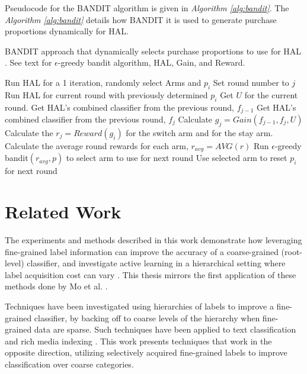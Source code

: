 \documentclass[ms]{nuthesis}
\begin{document}
Pseudocode for the BANDIT algorithm is given in \textit{Algorithm \ref{alg:bandit}}. The
\textit{Algorithm \ref{alg:bandit}} details how BANDIT it is used to generate
purchase proportions dynamically for HAL.

\begin{algorithm}[!htb]
\small{
\caption{ BANDIT approach that dynamically selects purchase
proportions to use for HAL \cite{yugi}. See text for
$\epsilon$-greedy bandit algorithm, HAL, Gain, and Reward.
}
\label{alg:bandit}
\begin{algorithmic}
\State Run HAL for a 1 iteration, randomly select Arms and $p_i$
\State Set round number to $j$
\State Run HAL for current round with previously determined $p_i$
\State Get $U$ for the current round.
\State Get HAL's combined classifier from the previous round, $f_{j-1}$
\State Get HAL's combined classifier from the previous round, $f_{j}$
\State Calculate $g_j=Gain(f_{j-1}, f_{j}, U)$
\State Calculate the $r_j=Reward(g_i)$ for the switch arm and for the stay arm.
\State Calculate the average round rewards for each arm, $r_{avg} = AVG(r)$
\State Run $\epsilon$-greedy bandit$(r_{avg}, p)$ to select arm to use for next round
\State Use selected arm to reset $p_i$ for next round
\EndWhile
\EndFunction
\end{algorithmic}
}
\end{algorithm}





\chapter{Related Work}
\par The experiments and methods described in this work
demonstrate how leveraging fine-grained label  information
can improve the accuracy of a coarse-grained (root-level) classifier, and
 investigate active learning in a hierarchical setting where
 label acquisition cost can vary \cite{yugi}. This thesis mirrors the first
 application of these methods done by Mo et al. \cite{yugi}.

\par Techniques have been investigated using hierarchies of labels to improve
  a fine-grained classifier, by backing off to coarse levels of the hierarchy
  when fine-grained data are sparse. Such techniques have been applied to
  text classification \cite{mccallum1998improving} and rich media indexing
  \cite{jiang2013}. This work presents techniques that work in the opposite
  direction, utilizing selectively acquired fine-grained labels to improve
  classification over coarse categories.
\end{document}
